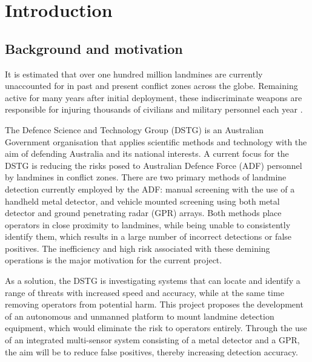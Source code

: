 \documentclass[main.tex]{subfiles}
\begin{document}

\chapter{Introduction}
\section{Background and motivation}

It is estimated that over one hundred million landmines are currently unaccounted for in past and present conflict zones across the globe. Remaining active for many years after initial deployment, these indiscriminate weapons are responsible for injuring thousands of civilians and military personnel each year \parencite{landmineMonitor2015}.

The Defence Science and Technology Group (DSTG) is an Australian Government organisation that applies scientific methods and technology with the aim of defending Australia and its national interests. A current focus for the DSTG is reducing the risks posed to Australian Defence Force (ADF) personnel by landmines in conflict zones. There are two primary methods of landmine detection currently employed by the ADF: manual screening with the use of a handheld metal detector, and vehicle mounted screening using both metal detector and ground penetrating radar (GPR) arrays. Both methods place operators in close proximity to landmines, while being unable to consistently identify them, which results in a large number of incorrect detections or false positives. The inefficiency and high risk associated  with these demining operations is the major motivation for the current project. 

As a solution, the DSTG is investigating systems that can locate and identify a range of threats with increased speed and accuracy, while at the same time removing operators from potential harm. 
This project proposes the development of an autonomous and unmanned platform to mount landmine detection equipment, which would eliminate the risk to operators entirely. Through the use of an integrated multi-sensor system consisting of a metal detector and a GPR, the aim will be to reduce false positives, thereby increasing detection accuracy.

% 
% 
%
\end{document}
